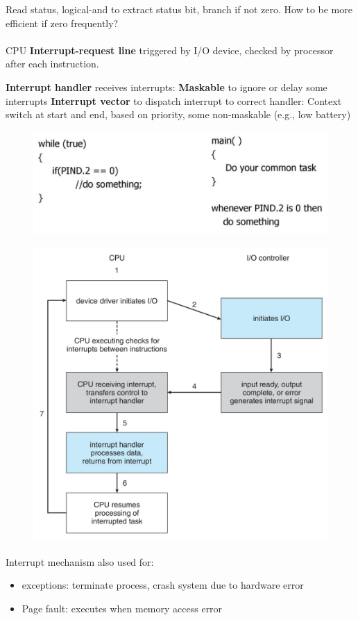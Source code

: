 Read status, logical-and to extract status bit, branch if not zero. How to be more efficient if zero frequently?

\paragraph{}

CPU \textbf{Interrupt-request line} triggered by I/O device, checked by processor after each instruction.

\textbf{Interrupt handler} receives interrupts: \textbf{Maskable} to ignore or delay some interrupts
\textbf{Interrupt vector} to dispatch interrupt to correct handler: Context switch at start and end, based on priority, some non-maskable (e.g., low battery)


\begin{figure}[h!]
    \centering
    \includegraphics[width=0.5\linewidth]{img/gndgng.png}
\end{figure}


\begin{figure}[h!]
    \centering
    \includegraphics[width=0.55\linewidth]{img/sdvng.png}
\end{figure}

Interrupt mechanism also used for:

\begin{itemize}
    \item exceptions: terminate process, crash system due to hardware error
    \item Page fault: executes when memory access error
\end{itemize}

